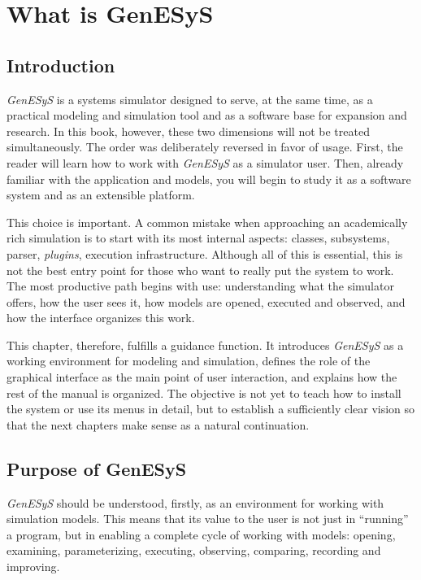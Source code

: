 \chapter{What is GenESyS}
\label{chap:o_que_e_o_genesys}

\section{Introduction}
\label{sec:cap1_introducao}

\textit{GenESyS} is a systems simulator designed to serve, at the same time, as a practical modeling and simulation tool and as a software base for expansion and research. In this book, however, these two dimensions will not be treated simultaneously. The order was deliberately reversed in favor of usage. First, the reader will learn how to work with \textit{GenESyS} as a simulator user. Then, already familiar with the application and models, you will begin to study it as a software system and as an extensible platform.

This choice is important. A common mistake when approaching an academically rich simulation is to start with its most internal aspects: classes, subsystems, parser, \textit{plugins}, execution infrastructure. Although all of this is essential, this is not the best entry point for those who want to really put the system to work. The most productive path begins with use: understanding what the simulator offers, how the user sees it, how models are opened, executed and observed, and how the interface organizes this work.

This chapter, therefore, fulfills a guidance function. It introduces \textit{GenESyS} as a working environment for modeling and simulation, defines the role of the graphical interface as the main point of user interaction, and explains how the rest of the manual is organized. The objective is not yet to teach how to install the system or use its menus in detail, but to establish a sufficiently clear vision so that the next chapters make sense as a natural continuation.

\section{Purpose of GenESyS}
\label{sec:cap1_finalidade}

\textit{GenESyS} should be understood, firstly, as an environment for working with simulation models. This means that its value to the user is not just in ``running'' a program, but in enabling a complete cycle of working with models: opening, examining, parameterizing, executing, observing, comparing, recording and improving.

